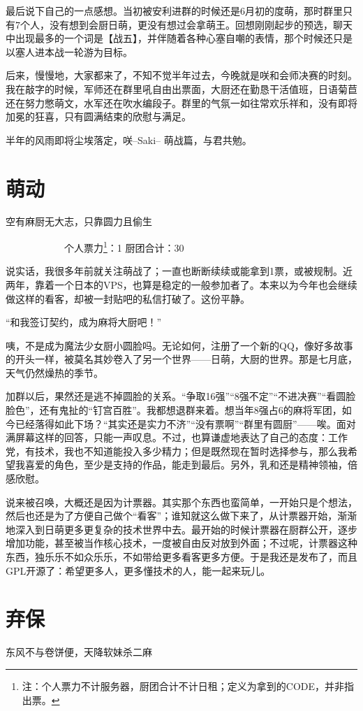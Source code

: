 最后说下自己的一点感想。当初被安利进群的时候还是6月初的度萌，那时群里只有7个人，没有想到会厨日萌，更没有想过会拿萌王。回想刚刚起步的预选，聊天中出现最多的一个词是【战五】，并伴随着各种心塞自嘲的表情，那个时候还只是以塞人进本战一轮游为目标。

后来，慢慢地，大家都来了，不知不觉半年过去，今晚就是咲和会师决赛的时刻。我在敲字的时候，军师还在群里吼自由出票面，大厨还在勤恳干活值班，日语菊苣还在努力憋萌文，水军还在吹水编段子。群里的气氛一如往常欢乐祥和，没有即将加冕的狂喜，只有圆满结束的欣慰与满足。

半年的风雨即将尘埃落定，咲–Saki– 萌战篇，与君共勉。



\section{萌动}
空有麻厨无大志，只靠圆力且偷生

　　　　　　个人票力\footnote{注：个人票力不计服务器，厨团合计不计日租；定义为拿到的CODE，并非指出票。}：1 厨团合计：30

说实话，我很多年前就关注萌战了；一直也断断续续或能拿到1票，或被规制。近两年，靠着一个日本的VPS，也算是稳定的一般参加者了。本来以为今年也会继续做这样的看客，却被一封贴吧的私信打破了。这份平静。

 “和我签订契约，成为麻将大厨吧！”

咦，不是成为魔法少女厨小圆脸吗。无论如何，注册了一个新的QQ，像好多故事的开头一样，被莫名其妙卷入了另一个世界——日萌，大厨的世界。那是七月底，天气仍然燥热的季节。

加群以后，果然还是逃不掉圆脸的关系。“争取16强”“8强不定”“不进决赛”“看圆脸脸色”，还有鬼扯的“钉宫百胜”。我都想退群来着。想当年8强占6的麻将军团，如今已经落得如此下场？“其实还是实力不济”“没有票啊”“群里有圆厨”——唉。面对满屏幕这样的回答，只能一声叹息。不过，也算谦虚地表达了自己的态度：工作党，有技术，我也不知道能投入多少精力；但是既然现在暂时选择参与，那么我希望我喜爱的角色，至少是支持的作品，能走到最后。另外，乳和还是精神领袖，倍感欣慰。

说来被召唤，大概还是因为计票器。其实那个东西也蛮简单，一开始只是个想法，然后也还是为了方便自己做个“看客”；谁知就这么做下来了，从计票器开始，渐渐地深入到日萌更多更复杂的技术世界中去。最开始的时候计票器在厨群公开，逐步增加功能，甚至被当作核心技术，一度被自由反对放到外面；不过呢，计票器这种东西，独乐乐不如众乐乐，不如带给更多看客更多方便。于是我还是发布了，而且GPL开源了：希望更多人，更多懂技术的人，能一起来玩儿。


\section{弃保}
东风不与卷饼便，天降软妹杀二麻

